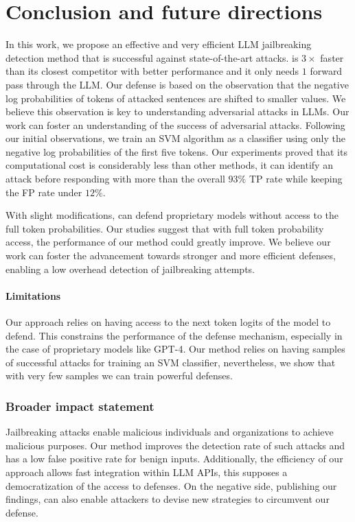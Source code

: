 \section{Conclusion and future directions}
\label{conclusion}

In this work, we propose an effective and very efficient LLM jailbreaking detection method that is successful against state-of-the-art attacks. \methodname{} is $3\times$ faster than its closest competitor with better performance and it only needs $1$ forward pass through the LLM. Our defense is based on the observation that the negative log probabilities of tokens of attacked sentences are shifted to smaller values. We believe this observation is key to understanding adversarial attacks in LLMs. Our work can foster an understanding of the success of adversarial attacks. Following our initial observations, we train an SVM algorithm as a classifier using only the negative log probabilities of the first five tokens. Our experiments proved that its computational cost is considerably less than other methods, it can identify an attack before responding with more than the overall $93\%$ TP rate while keeping the FP rate under $12\%$. 

With slight modifications, \methodname{} can defend proprietary models without access to the full token probabilities. Our studies suggest that with full token probability access, the performance of our method could greatly improve.  We believe our work can foster the advancement towards stronger and more efficient defenses, enabling a low overhead detection of jailbreaking attempts.

\paragraph{Limitations} Our approach relies on having access to the next token logits of the model to defend. This constrains the performance of the defense mechanism, especially in the case of proprietary models like GPT-4. Our method relies on having samples of successful attacks for training an SVM classifier, nevertheless, we show that with very few samples we can train powerful defenses.

\subsubsection*{Broader impact statement}
Jailbreaking attacks enable malicious individuals and organizations to achieve malicious purposes. Our method improves the detection rate of such attacks and has a low false positive rate for benign inputs. Additionally, the efficiency of our approach allows fast integration within LLM APIs, this supposes a democratization of the access to defenses. On the negative side, publishing our findings, can also enable attackers to devise new strategies to circumvent our defense.

